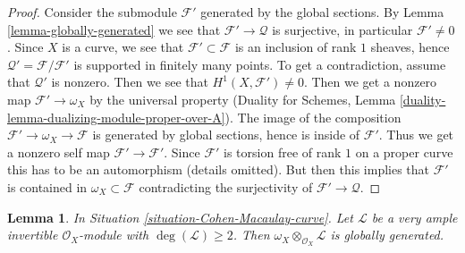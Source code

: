 \documentclass{stacks-project}
\theoremstyle{plain}
\newtheorem{lemma}[subsection]{Lemma}
\theoremstyle{definition}
\theoremstyle{remark}
\numberwithin{equation}{subsection}
\begin{document}
\begin{proof}
Consider the submodule $\mathcal{F}'$ generated by the global sections. By
Lemma \ref{lemma-globally-generated} we see that $\mathcal{F}' \to \mathcal{Q}$
is surjective, in particular $\mathcal{F}' \not = 0$. Since $X$ is a curve, we
see that $\mathcal{F}' \subset \mathcal{F}$ is an inclusion of rank $1$
sheaves, hence $\mathcal{Q}' = \mathcal{F}/\mathcal{F}'$ is supported in
finitely many points. To get a contradiction, assume that
$\mathcal{Q}'$ is nonzero. Then we see that $H^1(X, \mathcal{F}') \not = 0$.
Then we get a nonzero map $\mathcal{F}' \to \omega_X$ by the universal
property (Duality for Schemes, Lemma
\ref{duality-lemma-dualizing-module-proper-over-A}).
The image of the composition $\mathcal{F}' \to \omega_X \to \mathcal{F}$
is generated by global sections, hence is inside of $\mathcal{F}'$.
Thus we get a nonzero self map $\mathcal{F}' \to \mathcal{F}'$.
Since $\mathcal{F}'$ is torsion free of rank $1$ on a proper curve
this has to be an automorphism (details omitted). But then this implies that
$\mathcal{F}'$ is contained in $\omega_X \subset \mathcal{F}$
contradicting the surjectivity of $\mathcal{F}' \to \mathcal{Q}$.
\end{proof}

\begin{lemma}
\label{lemma-tensor-omega-with-globally-generated-invertible}
In Situation \ref{situation-Cohen-Macaulay-curve}. Let $\mathcal{L}$
be a very ample invertible $\mathcal{O}_X$-module with
$\deg(\mathcal{L}) \geq 2$. Then
$\omega_X \otimes_{\mathcal{O}_X} \mathcal{L}$ is globally generated.
\end{lemma}
\end{document}
